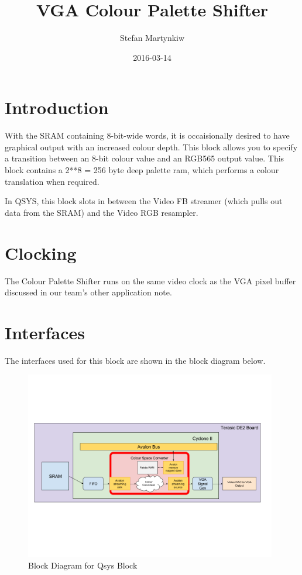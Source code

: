 \documentclass{capstonedoc}
\title{VGA Colour Palette Shifter}
\date{2016-03-14}
\author{Stefan Martynkiw}
\begin{document}
\maketitle

\section{Introduction}

With the SRAM containing 8-bit-wide words, it is occaisionally desired to have
graphical output with an increased colour depth. This block allows you to
specify a transition between an 8-bit colour value and an RGB565 output value.
This block contains a 2**8 = 256 byte deep palette ram, which performs a colour
translation when required.

In QSYS, this block slots in between the Video FB streamer (which pulls out
data from the SRAM) and the Video RGB resampler. 

\section{Clocking}

The Colour Palette Shifter runs on the same video clock as the VGA pixel buffer
discussed in our team's other application note.

\section{Interfaces}

The interfaces used for this block are shown in the block diagram below.

\begin{figure}[ht]
  \centering
  \includegraphics[width=11cm]{block-diagram-design}
  \caption{Block Diagram for Qsys Block}
  \label{fig:blockdiag}
\end{figure}
\end{document}
